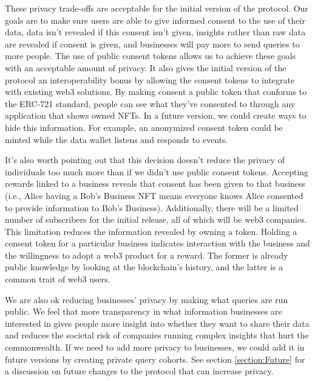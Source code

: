 These privacy trade-offs are acceptable for the initial version of the protocol. Our goals are to make sure users are able to give informed consent to the use of their data, data isn't revealed if this consent isn't given, insights rather than raw data are revealed if consent is given, and businesses will pay more to send queries to more people. The use of public consent tokens allows us to achieve these goals with an acceptable amount of privacy. It also gives the initial version of the protocol an interoperability bonus by allowing the consent tokens to integrate with existing web3 solutions. By making consent a public token that conforms to the ERC-721 standard, people can see what they've consented to through any application that shows owned NFTs. In a future version, we could create ways to hide this information. For example, an anonymized consent token could be minted while the data wallet listens and responds to events. %


It's also worth pointing out that this decision doesn't reduce the privacy of individuals too much more than if we didn't use public consent tokens. Accepting rewards linked to a business reveals that consent has been given to that business (i.e., Alice having a Bob's Business NFT means everyone knows Alice consented to provide information to Bob's Business). Additionally, there will be a limited number of subscribers for the initial release, all of which will be web3 companies. This limitation reduces the information revealed by owning a token. Holding a consent token for a particular business indicates interaction with the business and the willingness to adopt a web3 product for a reward. The former is already public knowledge by looking at the blockchain's history, and the latter is a common trait of web3 users.


We are also ok reducing businesses' privacy by making what queries are run public. We feel that more transparency in what information businesses are interested in gives people more insight into whether they want to share their data and reduces the societal risk of companies running complex insights that hurt the commonwealth. If we need to add more privacy to businesses, we could add it in future versions by creating private query cohorts. See section \ref{section:Future} for a discussion on future changes to the protocol that can increase privacy.


